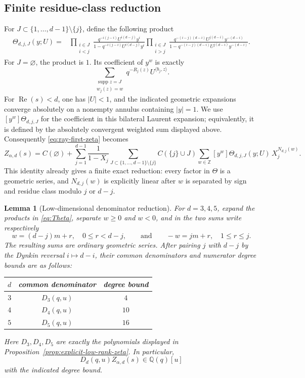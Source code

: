 \documentclass[11pt]{amsart}
\newcommand{\ZZ}{\mathbb Z}
\newcommand{\supp}{\operatorname{supp}}
\theoremstyle{plain}
\newtheorem{lemma}[theorem]{Lemma}
\theoremstyle{definition}
\numberwithin{equation}{section}
\begin{document}
\begin{appendix}
\subsection{Finite residue-class reduction}

For \(J\subset\{1,\ldots,d-1\}\setminus\{j\}\), define the following product
\begin{align}
 \Theta_{d,j,J}(y;U)
 ={}&
 \prod_{\substack{i\in J\\i<j}}
 \frac{q^{-i(j-i)}U^{i(d-j)}y^i}
 {1-q^{-i(j-i)}U^{i(d-j)}y^i}
 \prod_{\substack{i\in J\\i>j}}
 \frac{q^{-(i-j)(d-i)}U^{j(d-i)}y^{-(d-i)}}
 {1-q^{-(i-j)(d-i)}U^{j(d-i)}y^{-(d-i)}}.
\label{eq:Theta}
\end{align}
For \(J=\varnothing\), the product is \(1\).  Its coefficient of \(y^w\) is exactly
\[
  \sum_{\substack{\supp z=J\\w_j(z)=w}}
  q^{-R_j(z)}U^{\langle b_j,z\rangle}.
\]
For \(\operatorname{Re}(s)<d\), one has \(|U|<1\), and the indicated geometric
expansions converge absolutely on a nonempty annulus containing \(|y|=1\).  We use
\([y^w]\Theta_{d,j,J}\) for the coefficient in this bilateral Laurent expansion;
equivalently, it is defined by the absolutely convergent weighted sum displayed above.
Consequently \eqref{eq:ray-first-zeta} becomes
\begin{equation}\label{eq:theta-zeta}
 Z_{\alpha,d}(s)
 =
 C(\varnothing)+
 \sum_{j=1}^{d-1}\frac1{1-X_j}
 \sum_{J\subset\{1,\ldots,d-1\}\setminus\{j\}}C(\{j\}\cup J)
 \sum_{w\in\ZZ}[y^w]\Theta_{d,j,J}(y;U)\,
 X_j^{N_{d,j}(w)}.
\end{equation}
This identity already gives a finite exact reduction: every factor in \(\Theta\) is a
geometric series, and \(N_{d,j}(w)\) is explicitly linear after \(w\) is separated by sign
and residue class modulo \(j\) or \(d-j\).

\begin{lemma}[Low-dimensional denominator reduction]\label{lem:low-dimensional-denominator-reduction}
For \(d=3,4,5\), expand the products in \eqref{eq:Theta}, separate \(w\ge0\) and \(w<0\),
and in the two sums write respectively
\[
  w=(d-j)m+r,\quad0\le r<d-j,
  \qquad\text{and}\qquad
  -w=jm+r,\quad1\le r\le j.
\]
The resulting sums are ordinary geometric series.  After pairing \(j\) with \(d-j\) by
the Dynkin reversal \(i\mapsto d-i\), their common denominators and numerator degree bounds
are as follows:
\begin{center}
\renewcommand{\arraystretch}{1.2}
\begin{tabular}{c|c|c}
\(d\)&common denominator&degree bound\\
\hline
\(3\)&\(D_3(q,u)\)&\(4\)\\
\(4\)&\(D_4(q,u)\)&\(10\)\\
\(5\)&\(D_5(q,u)\)&\(16\)
\end{tabular}
\end{center}
Here \(D_3,D_4,D_5\) are exactly the polynomials displayed in
Proposition~\ref{prop:explicit-low-rank-zeta}.  In particular,
\[
  D_d(q,u)Z_{\alpha,d}(s)\in\mathbb Q(q)[u]
\]
with the indicated degree bound.
\end{lemma}


\end{appendix}
\end{document}
